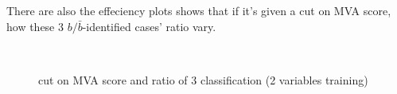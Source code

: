 		There are also the effeciency plots shows that if it's given a cut on MVA score, how these 3 $b/\bar{b}$-identified cases' ratio vary.

		\begin{figure}[H]
		\centering
			\\
		\caption{cut on MVA score and ratio of 3 classification (2 variables training)}
		\label{EventSelReco:fig:a04_bbsep_eff}
		\end{figure}
		\FloatBarrier

